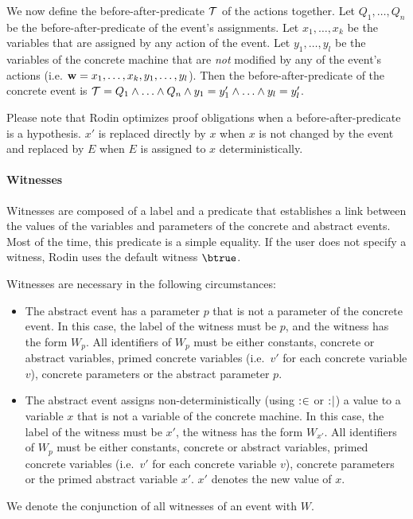 We now define the before-after-predicate $\mathcal{T}$ of the actions together.
Let $Q_1,\ldots,Q_n$ be the before-after-predicate of the event's assignments. 
Let $x_1,\ldots,x_k$ be the variables that are assigned by any action of the event.
Let $y_1,\ldots,y_l$ be the variables of the concrete machine that are \emph{not} modified by any of 
 the event's actions (i.e. $\mathbf{w} = x_1,\ldots,x_k,y_1,\ldots,y_l$).
Then the before-after-predicate of the concrete event is 
  $\mathcal{T} = Q_1 \land \ldots \land Q_n \land y_1 = y_1' \land \ldots \land y_l=y_l'$.

Please note that Rodin optimizes proof obligations when a before-after-predicate is a hypothesis.
$x'$ is replaced directly by $x$ when $x$ is not changed by the event and replaced by $E$
 when $E$ is assigned to $x$ deterministically.

\paragraph{Witnesses}
\label{witness}

Witnesses are composed of a label and a predicate that establishes a link between the values 
  of the variables and parameters of the concrete and abstract events.
Most of the time, this predicate is a simple equality.
If the user does not specify a witness, Rodin uses the default witness $\btrue$.

Witnesses are necessary in the following circumstances:
\begin{itemize}
\item The abstract event has a parameter $p$ that is not a parameter of the concrete  event.
  In this case, the label of the witness must be $p$, and the witness has the form  $W_p$.
  All identifiers of $W_p$ must be either constants, concrete or abstract variables,
  primed concrete variables (i.e.~$v'$ for each concrete variable $v$),
  concrete parameters or the abstract parameter $p$.
\item The abstract event assigns non-deterministically (using $\mathrel{:\mkern1mu\in}$ or $\mathrel{:\mkern1mu\mid}$) 
  a value to a variable $x$ that is not a variable of the concrete machine.
  In this case, the label of the witness must be $x'$, the witness has the form $W_{x'}$.
  All identifiers of $W_p$ must be either constants, concrete or abstract variables,
  primed concrete variables (i.e.~$v'$ for each concrete variable $v$),
  concrete parameters or the primed abstract variable $x'$.
  $x'$ denotes the new value of $x$.
\end{itemize}
We denote the conjunction of all witnesses of an event with $W$.

